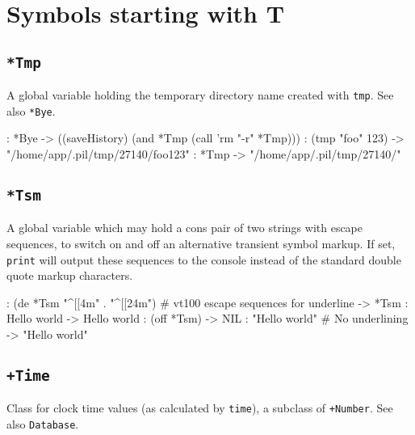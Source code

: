 %
%
%



\chapter{Symbols starting with T}
\label{cha:func-ref-T-functions-starting-with-T}
 
\section*{\texttt{*Tmp}}
\label{sec:func-ref-T-*Tmp}


A global variable holding the temporary directory name created with
\texttt{tmp}. See also \texttt{*Bye}.


\begin{wideverbatim}
: *Bye
-> ((saveHistory) (and *Tmp (call 'rm "-r" *Tmp)))
: (tmp "foo" 123)
-> "/home/app/.pil/tmp/27140/foo123"
: *Tmp
-> "/home/app/.pil/tmp/27140/"
\end{wideverbatim}

 
\section*{\texttt{*Tsm}}
\label{sec:func-ref-T-*Tsm}


A global variable which may hold a cons pair of two strings with escape
sequences, to switch on and off an alternative transient symbol markup.
If set, \texttt{print} will output these sequences to the console instead of
the standard double quote markup characters.


\begin{wideverbatim}
: (de *Tsm "^[[4m" . "^[[24m")   # vt100 escape sequences for underline
-> *Tsm
: Hello world
-> Hello world
: (off *Tsm)
-> NIL
: "Hello world"                  # No underlining
-> "Hello world"
\end{wideverbatim}

 
\section*{\texttt{+Time}}
\label{sec:func-ref-T-+Time}


Class for clock time values (as calculated by \texttt{time}), a subclass of
\texttt{+Number}. See also \texttt{Database}.


